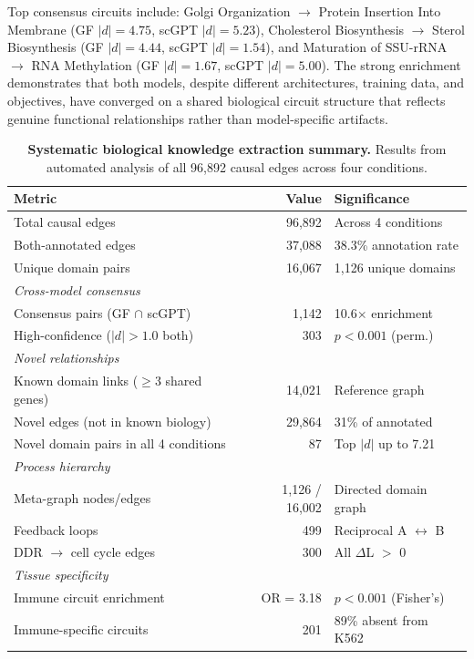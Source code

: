 \documentclass[onecolumn]{article}
\begin{document}
Top consensus circuits include: Golgi Organization $\to$ Protein Insertion Into Membrane (GF $|d|{=}4.75$, scGPT $|d|{=}5.23$), Cholesterol Biosynthesis $\to$ Sterol Biosynthesis (GF $|d|{=}4.44$, scGPT $|d|{=}1.54$), and Maturation of SSU-rRNA $\to$ RNA Methylation (GF $|d|{=}1.67$, scGPT $|d|{=}5.00$). The strong enrichment demonstrates that both models, despite different architectures, training data, and objectives, have converged on a shared biological circuit structure that reflects genuine functional relationships rather than model-specific artifacts.

\begin{table}[H]
\centering
\caption{\textbf{Systematic biological knowledge extraction summary.} Results from automated analysis of all 96,892 causal edges across four conditions.}
\label{tab:knowledge}
\smallskip
\begin{tabular}{lrl}
\toprule
Metric & Value & Significance \\
\midrule
Total causal edges & 96,892 & Across 4 conditions \\
Both-annotated edges & 37,088 & 38.3\% annotation rate \\
Unique domain pairs & 16,067 & 1,126 unique domains \\
\midrule
\multicolumn{3}{l}{\emph{Cross-model consensus}} \\
Consensus pairs (GF $\cap$ scGPT) & 1,142 & 10.6$\times$ enrichment \\
High-confidence ($|d|{>}1.0$ both) & 303 & $p < 0.001$ (perm.) \\
\midrule
\multicolumn{3}{l}{\emph{Novel relationships}} \\
Known domain links ($\geq$3 shared genes) & 14,021 & Reference graph \\
Novel edges (not in known biology) & 29,864 & 31\% of annotated \\
Novel domain pairs in all 4 conditions & 87 & Top $|d|$ up to 7.21 \\
\midrule
\multicolumn{3}{l}{\emph{Process hierarchy}} \\
Meta-graph nodes/edges & 1,126 / 16,002 & Directed domain graph \\
Feedback loops & 499 & Reciprocal A $\leftrightarrow$ B \\
DDR $\to$ cell cycle edges & 300 & All $\Delta$L $>$ 0 \\
\midrule
\multicolumn{3}{l}{\emph{Tissue specificity}} \\
Immune circuit enrichment & OR = 3.18 & $p < 0.001$ (Fisher's) \\
Immune-specific circuits & 201 & 89\% absent from K562 \\
\bottomrule
\end{tabular}
\end{table}
\end{document}
